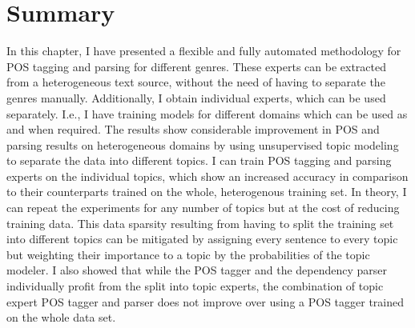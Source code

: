 

















\section{Summary}

In this chapter, I have presented a flexible and fully automated methodology for POS tagging and parsing for different genres. These experts can be extracted from a heterogeneous text source, without the need of having to separate the genres manually. Additionally, I obtain individual experts, which can be used separately. I.e., I have training models for different domains which can be used as and when required. The results show considerable improvement in POS and parsing results on heterogeneous domains by using unsupervised topic modeling to separate the data into different topics. I can train POS tagging and parsing experts on the individual topics, which show an increased accuracy in comparison to their counterparts trained on the whole, heterogenous training set. In theory, I can repeat the experiments for any number of topics but at the cost of reducing training data. This data sparsity resulting from having to split the training set into different topics can be mitigated by assigning every sentence to every topic but weighting their importance to a topic by the probabilities of the topic modeler. I also showed that while the POS tagger and the dependency parser individually profit from the split into topic experts, the combination of topic expert POS tagger and parser does not improve over using a POS tagger trained on the whole data set. 

